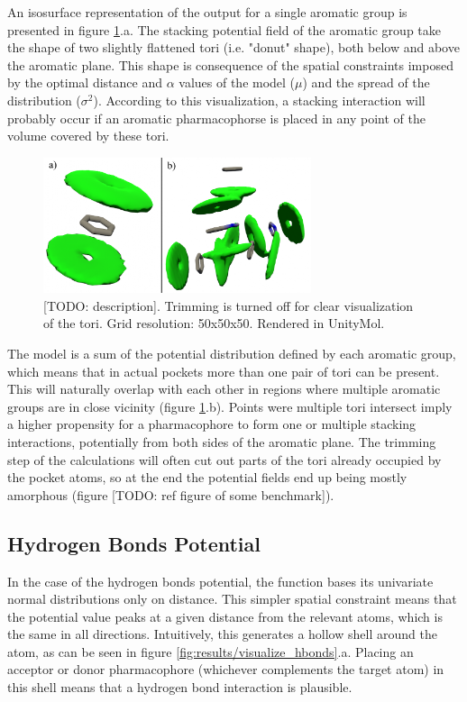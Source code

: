       An isosurface representation of the output for a single aromatic group is presented in figure \ref{fig:results/visualize_stacking}.a. The stacking potential field of the aromatic group take the shape of two slightly flattened tori (i.e. "donut" shape), both below and above the aromatic plane. This shape is consequence of the spatial constraints imposed by the optimal distance and $\alpha$ values of the model ($\mu$) and the spread of the distribution ($\sigma^2$). According to this visualization, a stacking interaction will probably occur if an aromatic pharmacophorse is placed in any point of the volume covered by these tori.

      \begin{figure}[H]
        \centering
        \includegraphics[width=0.7\textwidth]{figures/results/visualize_stacking.png}
        \caption{\label{fig:results/visualize_stacking} [TODO: description]. Trimming is turned off for clear visualization of the tori. Grid resolution: 50x50x50. Rendered in UnityMol.}
      \end{figure}

      The model is a sum of the potential distribution defined by each aromatic group, which means that in actual pockets more than one pair of tori can be present. This will naturally overlap with each other in regions where multiple aromatic groups are in close vicinity (figure \ref{fig:results/visualize_stacking}.b). Points were multiple tori intersect imply a higher propensity for a pharmacophore to form one or multiple stacking interactions, potentially from both sides of the aromatic plane. The trimming step of the calculations will often cut out parts of the tori already occupied by the pocket atoms, so at the end the potential fields end up being mostly amorphous (figure [TODO: ref figure of some benchmark]).

  \subsection{Hydrogen Bonds Potential}
    In the case of the hydrogen bonds potential, the function bases its univariate normal distributions only on distance. This simpler spatial constraint means that the potential value peaks at a given distance from the relevant atoms, which is the same in all directions. Intuitively, this generates a hollow shell around the atom, as can be seen in figure \ref{fig:results/visualize_hbonds}.a. Placing an acceptor or donor pharmacophore (whichever complements the target atom) in this shell means that a hydrogen bond interaction is plausible.

